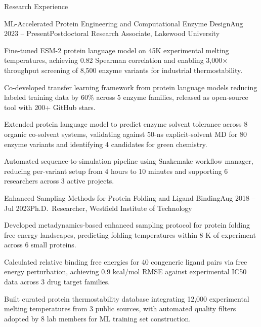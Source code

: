 \documentclass{resume}
\begin{document}
\begin{rSection}{Research Experience}

\begin{rSubsection}{ML-Accelerated Protein Engineering and Computational Enzyme Design}{\textcolor{black!60}{Aug 2023 -- Present}}{Postdoctoral Research Associate, Lakewood University}{}
\item Fine-tuned ESM-2 protein language model on 45K experimental melting temperatures, achieving 0.82 Spearman correlation and enabling 3,000$\times$ throughput screening of 8,500 enzyme variants for industrial thermostability.
\item Co-developed transfer learning framework from protein language models reducing labeled training data by 60\% across 5 enzyme families, released as open-source tool with 200+ GitHub stars.
\item Extended protein language model to predict enzyme solvent tolerance across 8 organic co-solvent systems, validating against 50-ns explicit-solvent MD for 80 enzyme variants and identifying 4 candidates for green chemistry.
\item Automated sequence-to-simulation pipeline using Snakemake workflow manager, reducing per-variant setup from 4 hours to 10 minutes and supporting 6 researchers across 3 active projects.
\end{rSubsection}

\begin{rSubsection}{Enhanced Sampling Methods for Protein Folding and Ligand Binding}{\textcolor{black!60}{Aug 2018 -- Jul 2023}}{Ph.D.\ Researcher, Westfield Institute of Technology}{}
\item Developed metadynamics-based enhanced sampling protocol for protein folding free energy landscapes, predicting folding temperatures within 8 K of experiment across 6 small proteins.
\item Calculated relative binding free energies for 40 congeneric ligand pairs via free energy perturbation, achieving 0.9 kcal/mol RMSE against experimental IC50 data across 3 drug target families.
\item Built curated protein thermostability database integrating 12,000 experimental melting temperatures from 3 public sources, with automated quality filters adopted by 8 lab members for ML training set construction.
\end{rSubsection}


\end{rSection}
\end{document}
